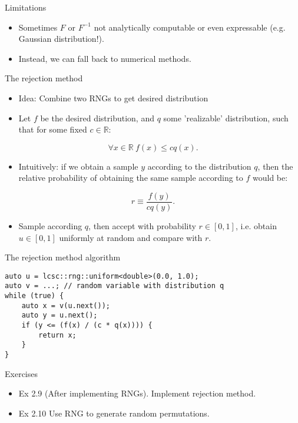 \documentclass[10pt]{beamer}
\begin{document}
\begin{frame}[label={sec:org2aa82fc}]{Limitations}
\begin{itemize}
\item Sometimes \(F\) or \(F^{-1}\) not analytically computable or even expressable
(e.g. Gaussian distribution!).
\item Instead, we can fall back to numerical methods.
\end{itemize}
\end{frame}

\begin{frame}[label={sec:org25dfdfa}]{The rejection method}
\begin{itemize}
\item \alert{Idea}: Combine two RNGs to get desired distribution
\item Let \(f\) be the desired distribution, and \(q\) some 'realizable' distribution, such that for some fixed \(c \in \mathbb{R}\):
\end{itemize}
$$\forall x \in \mathbb{R}~f(x) \leq c q(x).$$
\begin{itemize}
\item Intuitively: if we obtain a sample \(y\) according to the distribution \(q\), then the relative probability of obtaining the same sample according to \(f\) would be:
\end{itemize}
$$r \equiv \frac{f(y)}{c q(y)}.$$
\begin{itemize}
\item Sample according \(q\), then accept with probability \(r \in [0, 1]\), i.e. obtain \(u \in [0, 1]\) uniformly at random and compare with \(r\).
\end{itemize}
\end{frame}

\begin{frame}[fragile,label={sec:org22ddfbe}]{The rejection method algorithm}
 \begin{verbatim}
auto u = lcsc::rng::uniform<double>(0.0, 1.0);
auto v = ...; // random variable with distribution q
while (true) {
    auto x = v(u.next());
    auto y = u.next();
    if (y <= (f(x) / (c * q(x)))) {
        return x;
    }
}
\end{verbatim}
\end{frame}

\begin{frame}[label={sec:org72cb246}]{Exercises}
\begin{itemize}
\item \alert{\alert{Ex 2.9}} (After implementing RNGs). Implement rejection method.
\item \alert{\alert{Ex 2.10}} Use RNG to generate random permutations.
\end{itemize}
\end{frame}
\end{document}
